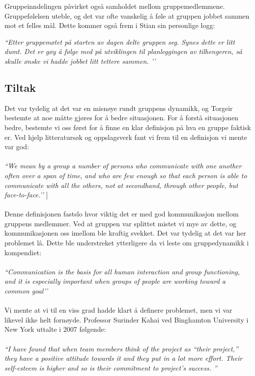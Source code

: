 Gruppeinndelingen påvirket også samholdet mellom gruppemedlemmene. Gruppefølelsen uteble, og det var ofte vanskelig å føle at gruppen jobbet sammen mot et felles mål. Dette kommer også frem i Stian sin personlige logg:\newline

\emph{``Etter gruppemøtet på starten av dagen delte gruppen seg. Synes dette er litt dumt. Det er gøy å følge med på utviklingen til planleggingen av tilhengeren, så skulle ønske vi hadde jobbet litt tettere sammen. ’’}

\subsection{Tiltak}
Det var tydelig at det var en misnøye rundt gruppens dynamikk, og Torgeir bestemte at noe måtte gjøres for å bedre situasjonen. For å forstå situasjonen bedre, bestemte vi oss først for å finne en klar definisjon på hva en gruppe faktisk er. Ved hjelp litteratursøk og oppslagsverk fant vi frem til en definisjon vi mente var god:\\\\
\emph{``We mean by a group a number of persons who communicate with one another often over a span of time, and who are few enough so that each person is able to communicate with all the others, not at secondhand, through other people, but face-to-face.’’} \cite{groundrules}]\\\\
Denne definisjonen fastslo hvor viktig det er med god kommunikasjon mellom gruppens medlemmer. Ved at gruppen var splittet mistet vi mye av dette, og kommunikasjonen oss imellom ble kraftig svekket. Det var tydelig at det var her problemet lå. Dette ble understreket ytterligere da vi leste om gruppedynamikk i kompendiet:\\\\
\emph{``Communication is the basis for all human interaction and group functioning, and it is especially important when groups of people are working toward a common goal’’} \cite{groundrules}\\\\
Vi mente at vi til en viss grad hadde klart å definere problemet, men vi var likevel ikke helt fornøyde. Professor Surinder Kahai ved Binghamton University i New York uttalte i 2007 følgende:\\\\
\emph{``I have found that when team members think of the project as “their project,” they have a positive attitude towards it and they put in a lot more effort. Their self-esteem is higher and so is their commitment to project’s success. ''} \cite{leading}\newline

